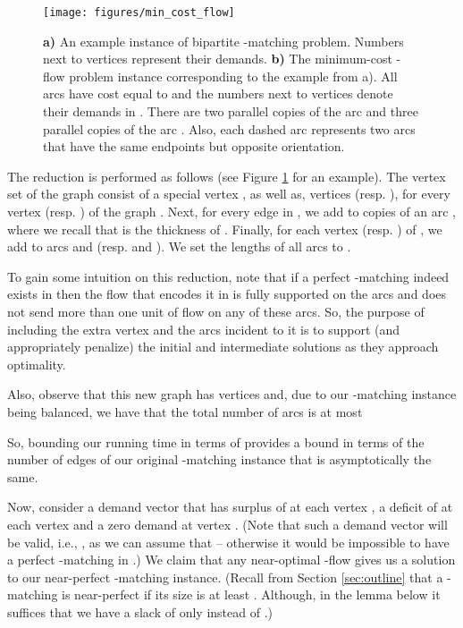 \documentclass[11pt, letterpaper]{article}
\begin{document}
\begin{figure}[ht]
\centering
\vspace{8pt}
\texttt{[image: figures/min\_cost\_flow]}
\vspace{8pt}
\caption{{\bf a)} An example instance of bipartite -matching problem. Numbers next to vertices represent their demands.  {\bf b)} The minimum-cost -flow problem instance corresponding to the example from a). All arcs have cost  equal to  and the numbers next to vertices denote their demands in . There are two parallel copies of the arc  and three parallel copies of the arc . Also, each dashed arc represents two arcs that have the same endpoints but opposite orientation. }
\label{fig:min_cost_example}
\end{figure}



The reduction is performed as follows (see Figure \ref{fig:min_cost_example} for an example). The vertex set  of the graph  consist of a special vertex , as well as, vertices  (resp. ), for every vertex  (resp. ) of the graph . Next, for every edge  in , we add to   copies of an arc , where we recall that  is the thickness of . Finally, for each vertex  (resp. ) of , we add to  arcs  and  (resp.  and ). We set the lengths  of all arcs  to . 

To gain some intuition on this reduction, note that if a perfect -matching indeed exists in  then the flow that encodes it in  is fully supported on the arcs  and does not send more than one unit of flow on any of these arcs. So, the purpose of including the extra vertex  and the arcs incident to it is to support (and appropriately penalize) the initial and intermediate solutions as they approach optimality.  

Also, observe that this new graph has  vertices and, due to our -matching instance being balanced, we have that the total number  of arcs is at most

So, bounding our running time in terms of  provides a bound in terms of the number of edges  of our original -matching instance that is asymptotically the same. 

Now, consider a demand vector  that has surplus of  at each vertex , a deficit of  at each vertex  and a zero demand at vertex . (Note that such a demand vector will be valid, i.e., , as we can assume that  -- otherwise it would be impossible to have a perfect -matching in .) We claim that any near-optimal -flow gives us a solution to our near-perfect -matching instance. (Recall from Section \ref{sec:outline} that a -matching is near-perfect if its size is at least . Although, in the lemma below it suffices that we have a slack of only  instead of .)
\end{document}
